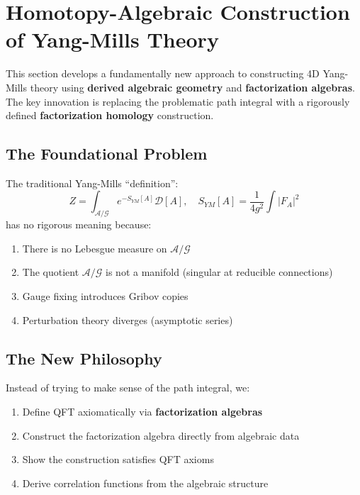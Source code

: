 \section{Homotopy-Algebraic Construction of Yang-Mills Theory}
\label{sec:homotopy-construction}

This section develops a fundamentally new approach to constructing 4D Yang-Mills theory using \textbf{derived algebraic geometry} and \textbf{factorization algebras}. The key innovation is replacing the problematic path integral with a rigorously defined \textbf{factorization homology} construction.

\subsection{The Foundational Problem}

The traditional Yang-Mills ``definition'':
\[
Z = \int_{\mathcal{A}/\mathcal{G}} e^{-S_{YM}[A]} \mathcal{D}[A], \quad S_{YM}[A] = \frac{1}{4g^2}\int |F_A|^2
\]
has no rigorous meaning because:
\begin{enumerate}
    \item There is no Lebesgue measure on $\mathcal{A}/\mathcal{G}$
    \item The quotient $\mathcal{A}/\mathcal{G}$ is not a manifold (singular at reducible connections)
    \item Gauge fixing introduces Gribov copies
    \item Perturbation theory diverges (asymptotic series)
\end{enumerate}

\subsection{The New Philosophy}

Instead of trying to make sense of the path integral, we:
\begin{enumerate}
    \item Define QFT axiomatically via \textbf{factorization algebras}
    \item Construct the factorization algebra directly from algebraic data
    \item Show the construction satisfies QFT axioms
    \item Derive correlation functions from the algebraic structure
\end{enumerate}

